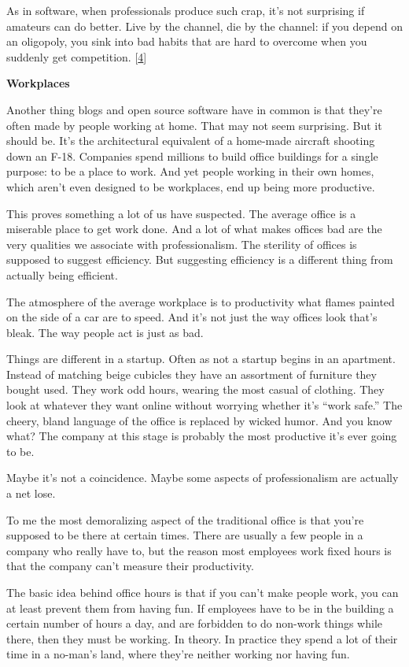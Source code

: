 As in software, when professionals produce such crap, it's not
surprising if amateurs can do better. Live by the channel, die by the
channel: if you depend on an oligopoly, you sink into bad habits that
are hard to overcome when you suddenly get competition.
{[}\hyperref[f4n]{4}{]}

\textbf{Workplaces}

Another thing blogs and open source software have in common is that
they're often made by people working at home. That may not seem
surprising. But it should be. It's the architectural equivalent of a
home-made aircraft shooting down an F-18. Companies spend millions to
build office buildings for a single purpose: to be a place to work. And
yet people working in their own homes, which aren't even designed to be
workplaces, end up being more productive.

This proves something a lot of us have suspected. The average office is
a miserable place to get work done. And a lot of what makes offices bad
are the very qualities we associate with professionalism. The sterility
of offices is supposed to suggest efficiency. But suggesting efficiency
is a different thing from actually being efficient.

The atmosphere of the average workplace is to productivity what flames
painted on the side of a car are to speed. And it's not just the way
offices look that's bleak. The way people act is just as bad.

Things are different in a startup. Often as not a startup begins in an
apartment. Instead of matching beige cubicles they have an assortment of
furniture they bought used. They work odd hours, wearing the most casual
of clothing. They look at whatever they want online without worrying
whether it's ``work safe.'' The cheery, bland language of the office is
replaced by wicked humor. And you know what? The company at this stage
is probably the most productive it's ever going to be.

Maybe it's not a coincidence. Maybe some aspects of professionalism are
actually a net lose.

To me the most demoralizing aspect of the traditional office is that
you're supposed to be there at certain times. There are usually a few
people in a company who really have to, but the reason most employees
work fixed hours is that the company can't measure their productivity.

The basic idea behind office hours is that if you can't make people
work, you can at least prevent them from having fun. If employees have
to be in the building a certain number of hours a day, and are forbidden
to do non-work things while there, then they must be working. In theory.
In practice they spend a lot of their time in a no-man's land, where
they're neither working nor having fun.

